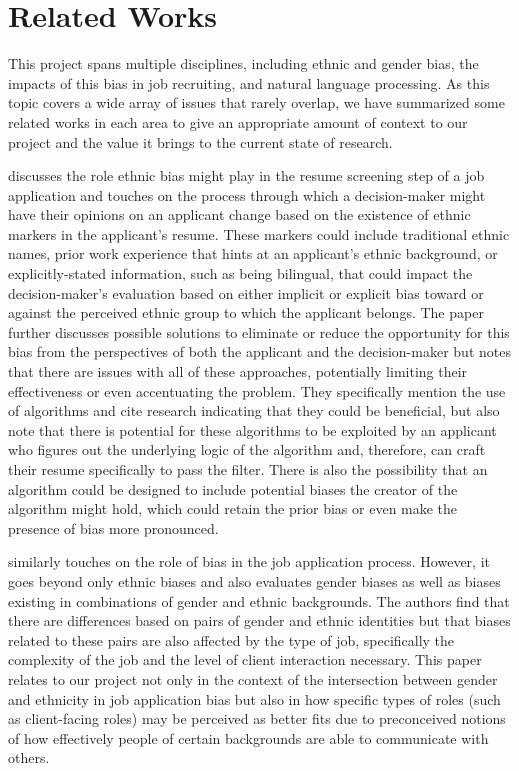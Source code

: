\documentclass{article}
\begin{document}
\section{Related Works}

This project spans multiple disciplines, including ethnic and gender bias, the impacts of this bias in job recruiting, and natural language processing. As this topic covers a wide array of issues that rarely overlap, we have summarized some related works in each area to give an appropriate amount of context to our project and the value it brings to the current state of research.

\cite{derous2019your} discusses the role ethnic bias might play in the resume screening step of a job application and touches on the process through which a decision-maker might have their opinions on an applicant change based on the existence of ethnic markers in the applicant's resume. These markers could include traditional ethnic names, prior work experience that hints at an applicant's ethnic background, or explicitly-stated information, such as being bilingual, that could impact the decision-maker's evaluation based on either implicit or explicit bias toward or against the perceived ethnic group to which the applicant belongs. The paper further discusses possible solutions to eliminate or reduce the opportunity for this bias from the perspectives of both the applicant and the decision-maker but notes that there are issues with all of these approaches, potentially limiting their effectiveness or even accentuating the problem. They specifically mention the use of algorithms and cite research indicating that they could be beneficial, but also note that there is potential for these algorithms to be exploited by an applicant who figures out the underlying logic of the algorithm and, therefore, can craft their resume specifically to pass the filter. There is also the possibility that an algorithm could be designed to include potential biases the creator of the algorithm might hold, which could retain the prior bias or even make the presence of bias more pronounced.

\cite{derous2015double} similarly touches on the role of bias in the job application process. However, it goes beyond only ethnic biases and also evaluates gender biases as well as biases existing in combinations of gender and ethnic backgrounds. The authors find that there are differences based on pairs of gender and ethnic identities but that biases related to these pairs are also affected by the type of job, specifically the complexity of the job and the level of client interaction necessary. This paper relates to our project not only in the context of the intersection between gender and ethnicity in job application bias but also in how specific types of roles (such as client-facing roles) may be perceived as better fits due to preconceived notions of how effectively people of certain backgrounds are able to communicate with others.
\end{document}
